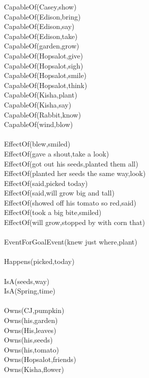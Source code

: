 \begin{multicols}{2}
\begin{footnotesize}
\noindent
CapableOf(Casey,show) \\
CapableOf(Edison,bring) \\
CapableOf(Edison,say) \\
CapableOf(Edison,take) \\
CapableOf(garden,grow) \\
CapableOf(Hopsalot,give) \\
CapableOf(Hopsalot,sigh) \\
CapableOf(Hopsalot,smile) \\
CapableOf(Hopsalot,think) \\
CapableOf(Kisha,plant) \\
CapableOf(Kisha,say) \\
CapableOf(Rabbit,know) \\
CapableOf(wind,blow) \\
~\\
EffectOf(blew,smiled) \\
EffectOf(gave a shout,take a look) \\
EffectOf(got out his seeds,planted them all) \\
EffectOf(planted her seeds the same way,look) \\
EffectOf(said,picked today) \\
EffectOf(said,will grow big and tall) \\
EffectOf(showed off his tomato so red,said) \\
EffectOf(took a big bite,smiled) \\
EffectOf(will grow,stopped by with corn that) \\
~\\
EventForGoalEvent(knew just where,plant) \\
~\\
Happens(picked,today) \\
~\\
IsA(seeds,way) \\
IsA(Spring,time) \\
~\\
Owns(CJ,pumpkin) \\
Owns(his,garden) \\
Owns(His,leaves) \\
Owns(his,seeds) \\
Owns(his,tomato) \\
Owns(Hopsalot,friends) \\
Owns(Kisha,flower) \\

\end{footnotesize}
\end{multicols}
